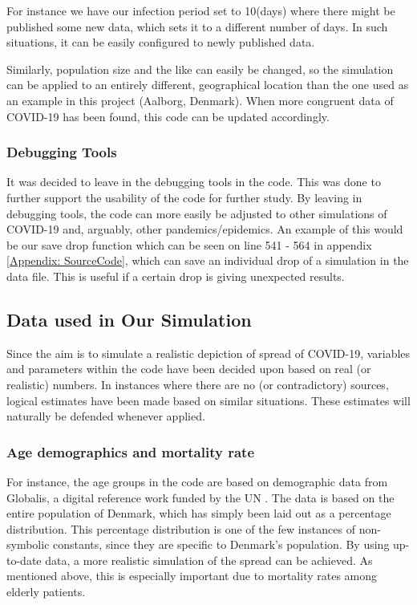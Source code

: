 For instance we have our infection period set to 10(days) where there might be published some new data, which sets it to a different number of days. In such situations, it can be easily configured to newly published data. 

Similarly, population size and the like can easily be changed, so the simulation can be applied to an entirely different, geographical location than the one used as an example in this project (Aalborg, Denmark). When more congruent data of COVID-19 has been found, this code can be updated accordingly. 

\subsubsection{Debugging Tools}

It was decided to leave in the debugging tools in the code. This was done to further support the usability of the code for further study. By leaving in debugging tools, the code can more easily be adjusted to other simulations of COVID-19 and, arguably, other pandemics/epidemics. An example of this would be our save drop function which can be seen on line 541 - 564 in appendix \ref{Appendix: SourceCode}, which can save an individual drop of a simulation in the data file. This is useful if a certain drop is giving unexpected results.

\subsection{Data used in Our Simulation} \label{subsec:Data in Sim}

Since the aim is to simulate a realistic depiction of spread of COVID-19, variables and parameters within the code have been decided upon based on real (or realistic) numbers. In instances where there are no (or contradictory) sources, logical estimates have been made based on similar situations. These estimates will naturally be defended whenever applied.

\subsubsection{Age demographics and mortality rate}
For instance, the age groups in the code are based on demographic data from Globalis, a digital reference work funded by the UN \citep{globalisdk_danmark_2020}. The data is based on the entire population of Denmark, which has simply been laid out as a percentage distribution. This percentage distribution is one of the few instances of non-symbolic constants, since they are specific to Denmark's population. By using up-to-date data, a more realistic simulation of the spread can be achieved. As mentioned above, this is especially important due to mortality rates among elderly patients.

